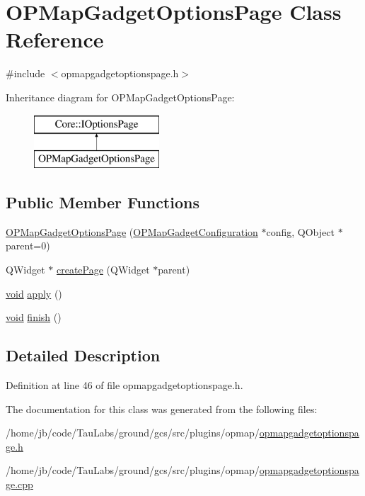 \hypertarget{class_o_p_map_gadget_options_page}{\section{\-O\-P\-Map\-Gadget\-Options\-Page \-Class \-Reference}
\label{class_o_p_map_gadget_options_page}
}


{\ttfamily \#include $<$opmapgadgetoptionspage.\-h$>$}

\-Inheritance diagram for \-O\-P\-Map\-Gadget\-Options\-Page\-:\begin{figure}[H]
\begin{center}
\leavevmode
\includegraphics[height=2.000000cm]{class_o_p_map_gadget_options_page}
\end{center}
\end{figure}
\subsection*{\-Public \-Member \-Functions}
\begin{DoxyCompactItemize}
\item 
\hyperlink{group___o_p_map_plugin_ga23f0a8c69cfb41e42f3304d1b4a4cd34}{\-O\-P\-Map\-Gadget\-Options\-Page} (\hyperlink{class_o_p_map_gadget_configuration}{\-O\-P\-Map\-Gadget\-Configuration} $\ast$config, \-Q\-Object $\ast$parent=0)
\item 
\-Q\-Widget $\ast$ \hyperlink{group___o_p_map_plugin_gaec7ef2751680eb7ff0f4f6abdf2fd4c4}{create\-Page} (\-Q\-Widget $\ast$parent)
\item 
\hyperlink{group___u_a_v_objects_plugin_ga444cf2ff3f0ecbe028adce838d373f5c}{void} \hyperlink{group___o_p_map_plugin_ga8b2ec9377a2fb5a144b5c5aab349225f}{apply} ()
\item 
\hyperlink{group___u_a_v_objects_plugin_ga444cf2ff3f0ecbe028adce838d373f5c}{void} \hyperlink{group___o_p_map_plugin_ga7d645e14473ae14e762cc694e85e28a8}{finish} ()
\end{DoxyCompactItemize}


\subsection{\-Detailed \-Description}


\-Definition at line 46 of file opmapgadgetoptionspage.\-h.



\-The documentation for this class was generated from the following files\-:\begin{DoxyCompactItemize}
\item 
/home/jb/code/\-Tau\-Labs/ground/gcs/src/plugins/opmap/\hyperlink{opmapgadgetoptionspage_8h}{opmapgadgetoptionspage.\-h}\item 
/home/jb/code/\-Tau\-Labs/ground/gcs/src/plugins/opmap/\hyperlink{opmapgadgetoptionspage_8cpp}{opmapgadgetoptionspage.\-cpp}\end{DoxyCompactItemize}
